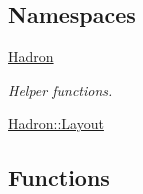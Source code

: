 \subsection*{Namespaces}
\begin{DoxyCompactItemize}
\item 
 \mbox{\hyperlink{namespaceHadron}{Hadron}}
\begin{DoxyCompactList}\small\item\em Helper functions. \end{DoxyCompactList}\item 
 \mbox{\hyperlink{namespaceHadron_1_1Layout}{Hadron\+::\+Layout}}
\end{DoxyCompactItemize}
\subsection*{Functions}
